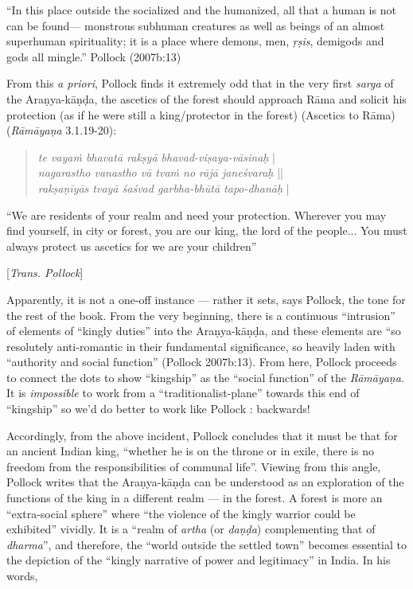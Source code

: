 \begin{myquote}
“In this place outside the socialized and the humanized, all that a human is not can be found--- monstrous subhuman creatures as well as beings of an almost superhuman spirituality; it is a place where demons, men, {\sl ṛṣis}, demigods and gods all mingle.”
\hfill	 Pollock (2007b:13)
\end{myquote}

From this {\sl a priori}, Pollock finds it extremely odd that in the very first {\sl sarga} of the Araṇya-kāṇḍa, the ascetics of the forest should approach Rāma and solicit his protection (as if he were still a king/protector in the forest)  (Ascetics to Rāma) ({\sl Rāmāyaṇa} 3.1.19-20):
\begin{quote}
{{\sl te vayaṁ bhavatā rakṣyā bhavad-viṣaya-vāsinaḥ}} |\\
{\sl nagarastho vanastho vā tvaṁ no rājā janeśvaraḥ} ||\\
{\sl rakṣaṇīyās tvayā śaśvad garbha-bhūtā tapo-dhanāḥ} |
\end{quote}

\begin{myquote}
“We are residents of your realm and need your protection. Wherever you may find yourself, in city or forest, you are our king, the lord of the people... You must always protect us ascetics for we are your children” 

\hfill[{\sl Trans. Pollock}]
\end{myquote}

Apparently, it is not a one-off instance --- rather it sets, says Pollock, the tone for the rest of the book. From the very beginning, there is a continuous “intrusion” of elements of “kingly duties” into the Araṇya-kāṇḍa, and these elements are “so resolutely anti-romantic in their fundamental significance, so heavily laden with “authority and social function” (Pollock 2007b:13). From here, Pollock proceeds to connect the dots to show “kingship” as the “social function” of the {\sl Rāmāyaṇa}.  It is {\sl impossible} to work from a “traditionalist-plane” towards this end of “kingship” so we’d do better to work like Pollock : backwards!

Accordingly, from the above incident, Pollock concludes that it must be that for an ancient Indian king, “whether he is on the throne or in exile, there is no freedom from the responsibilities of communal life”.  Viewing from this angle, Pollock writes that the Araṇya-kāṇḍa can be understood as an exploration of the functions of the king in a different realm --- in the forest. A forest is more an “extra-social sphere” where “the violence of the kingly warrior could be exhibited” vividly. It is a “realm of {\sl artha} (or {\sl daṇḍa}) complementing that of {\sl dharma}”, and therefore, the “world outside the settled town” becomes essential to the depiction of the “kingly narrative of power and legitimacy” in India. In his words, 

